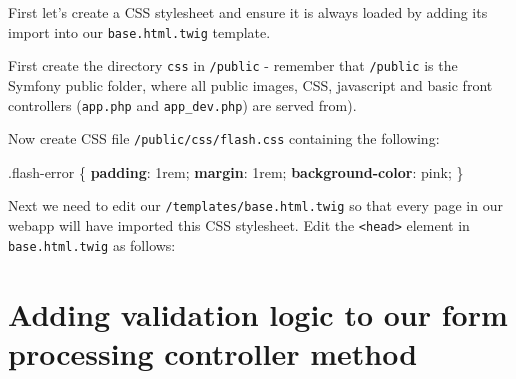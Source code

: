\documentclass[a4paperpaper,openright]{book}
\newenvironment{Shaded}{}{}
\newcommand{\ConstantTok}[1]{\textcolor[rgb]{0.53,0.00,0.00}{#1}}
\newcommand{\DataTypeTok}[1]{\textcolor[rgb]{0.56,0.13,0.00}{#1}}
\newcommand{\DecValTok}[1]{\textcolor[rgb]{0.25,0.63,0.44}{#1}}
\newcommand{\FunctionTok}[1]{\textcolor[rgb]{0.02,0.16,0.49}{#1}}
\newcommand{\ImportTok}[1]{#1}
\newcommand{\KeywordTok}[1]{\textcolor[rgb]{0.00,0.44,0.13}{\textbf{#1}}}
\newcommand{\NormalTok}[1]{#1}
\newcommand{\OperatorTok}[1]{\textcolor[rgb]{0.40,0.40,0.40}{#1}}
\newcommand{\OtherTok}[1]{\textcolor[rgb]{0.00,0.44,0.13}{#1}}
\newcommand{\StringTok}[1]{\textcolor[rgb]{0.25,0.44,0.63}{#1}}
\begin{document}
First let's create a CSS stylesheet and ensure it is always loaded by
adding its import into our \texttt{base.html.twig} template.

First create the directory \texttt{css} in \texttt{/public} - remember
that \texttt{/public} is the Symfony public folder, where all public
images, CSS, javascript and basic front controllers (\texttt{app.php}
and \texttt{app\_dev.php}) are served from).

Now create CSS file \texttt{/public/css/flash.css} containing the
following:

\begin{Shaded}
\begin{Highlighting}[]
    \FunctionTok{.flash-error}\NormalTok{ \{}
        \KeywordTok{padding}\NormalTok{: }\DecValTok{1}\DataTypeTok{rem}\OperatorTok{;}
        \KeywordTok{margin}\NormalTok{: }\DecValTok{1}\DataTypeTok{rem}\OperatorTok{;}
        \KeywordTok{background-color}\NormalTok{: }\ConstantTok{pink}\OperatorTok{;}
\NormalTok{    \}}
\end{Highlighting}
\end{Shaded}

Next we need to edit our \texttt{/templates/base.html.twig} so that
every page in our webapp will have imported this CSS stylesheet. Edit
the \texttt{\textless{}head\textgreater{}} element in
\texttt{base.html.twig} as follows:

\begin{Shaded}
\end{Shaded}

\hypertarget{adding-validation-logic-to-our-form-processing-controller-method}{%
\section{Adding validation logic to our form processing controller
method}\label{adding-validation-logic-to-our-form-processing-controller-method}}
\end{document}
